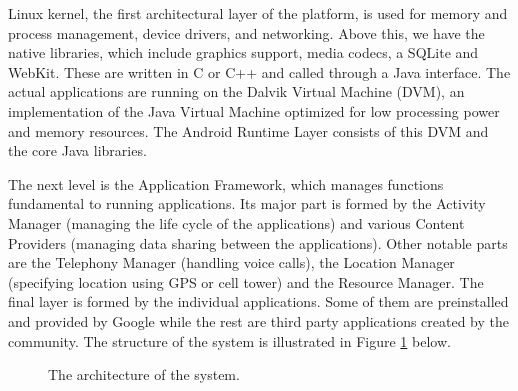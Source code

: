 Linux kernel, the first architectural layer of the platform, is used for memory and process management, device drivers, and networking.
Above this, we have the native libraries, which include graphics support, media codecs, a SQLite and WebKit.
These are written in C or C++ and called through a Java interface.
The actual applications are running on the Dalvik Virtual Machine (DVM), an implementation of the Java Virtual Machine optimized for low processing power and memory resources.
The Android Runtime Layer consists of this DVM and the core Java libraries. 

The next level is the Application Framework, which manages functions fundamental to running applications.
Its major part is formed by the Activity Manager (managing the life cycle of the applications) and various Content Providers (managing data sharing between the applications).
Other notable parts are the Telephony Manager (handling voice calls), the Location Manager (specifying location using GPS or cell tower) and the Resource Manager.
The final layer is formed by the individual applications.
Some of them are preinstalled and provided by Google while the rest are third party applications created by the community.
The structure of the system is illustrated in Figure \ref{fig:architecture} below.
\begin{figure}[h!]
    \label{fig:architecture}
    \caption{The architecture of the system.}
\end{figure}

